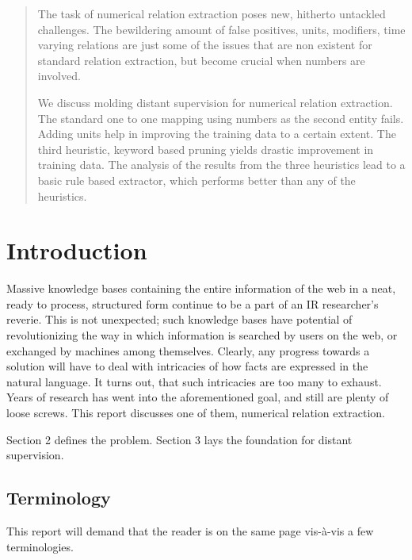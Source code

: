 \documentclass[a4paper,10pt]{article}
\begin{document}
\begin{abstract}
The task of numerical relation extraction poses new, hitherto untackled challenges. The bewildering amount of false positives, units, 
modifiers, time varying relations are just some of the issues that are non existent for standard relation extraction, but become 
crucial when numbers are involved.

We discuss molding distant supervision for numerical relation extraction. The standard one to one mapping using numbers as the second entity 
fails. Adding units help in improving the training data to a certain extent. The third heuristic, keyword based pruning yields drastic improvement
in training data.
The analysis of the results from the three heuristics lead to a basic rule based extractor, which performs better than any of the heuristics.

\end{abstract}

\section{Introduction}
Massive knowledge bases containing the entire information of the web in a neat, ready to process, structured form continue to be a part of an IR researcher's reverie.
This is not unexpected; such knowledge bases have potential of revolutionizing the way in which information is searched by users on the web, or exchanged by machines among
themselves. 
Clearly, any progress towards a solution will have to deal with intricacies of how facts are expressed in the natural language.
It turns out, that such intricacies are too many to exhaust. Years of research has went into the aforementioned goal, and still
are plenty of loose screws. This report discusses one of them, numerical relation extraction.

Section 2 defines the problem. Section 3 lays the foundation for distant supervision.


\subsection{Terminology}
This report will demand that the reader is on the same page vis-à-vis a few terminologies.
\end{document}
